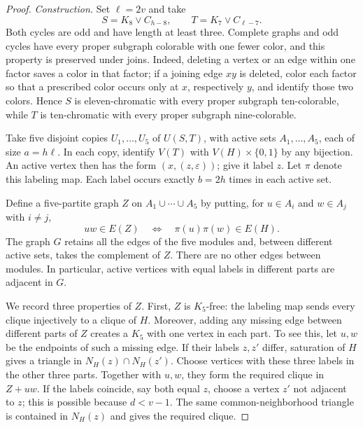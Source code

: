 \documentclass[11pt]{article}
\numberwithin{equation}{section}
\begin{document}
\begin{proof}
\emph{Construction.}
Set \(\ell=2v\) and take
\[
 S=K_8\vee C_{h-8},\qquad T=K_7\vee C_{\ell-7}.
\]
Both cycles are odd and have length at least three. Complete graphs
and odd cycles have every proper subgraph colorable with one fewer
color, and this property is preserved under joins. Indeed, deleting a
vertex or an edge within one factor saves a color in that factor; if a
joining edge \(xy\) is deleted, color each factor so that a prescribed
color occurs only at \(x\), respectively \(y\), and identify those two
colors. Hence \(S\) is eleven-chromatic with every proper subgraph
ten-colorable, while \(T\) is ten-chromatic with every proper subgraph
nine-colorable.

Take five disjoint copies \(U_1,\ldots,U_5\) of \(U(S,T)\),
with active sets \(A_1,\ldots,A_5\), each of size \(a=h\ell\).
In each copy, identify \(V(T)\) with \(V(H)\times\{0,1\}\)
by any bijection. An active vertex then has the form
\((x,(z,\varepsilon))\); give it label \(z\).
Let \(\pi\) denote this labeling map. Each label occurs
exactly \(b=2h\) times in each active set.

Define a five-partite graph \(Z\) on \(A_1\cup\cdots\cup A_5\)
by putting, for \(u\in A_i\) and \(w\in A_j\) with \(i\ne j\),
\begin{equation}\label{eq:Z}
 uw\in E(Z)\quad\Longleftrightarrow\quad
 \pi(u)\pi(w)\in E(H).
\end{equation}
The graph \(G\) retains all the edges of the five modules and,
between different active sets, takes the complement of \(Z\).
There are no other edges between modules. In particular, active
vertices with equal labels in different parts are adjacent in \(G\).

We record three properties of \(Z\). First, \(Z\) is
\(K_5\)-free: the labeling map sends every clique injectively
to a clique of \(H\). Moreover, adding any missing edge between
different parts of \(Z\) creates a \(K_5\) with one vertex in
each part. To see this, let \(u,w\) be the endpoints of such a
missing edge. If their labels \(z,z'\) differ, saturation of
\(H\) gives a triangle in \(N_H(z)\cap N_H(z')\). Choose
vertices with these three labels in the other three parts.
Together with \(u,w\), they form the required clique in
\(Z+uw\). If the labels coincide, say both equal \(z\), choose
a vertex \(z'\) not adjacent to \(z\); this is possible because
\(d<v-1\). The same common-neighborhood triangle is contained
in \(N_H(z)\) and gives the required clique.


\end{proof}
\end{document}
